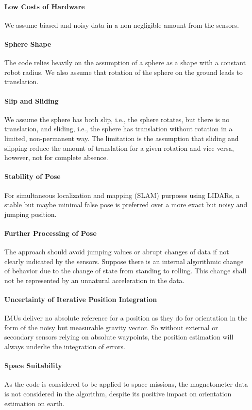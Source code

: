 \documentclass[letterpaper, 10 pt, conference]{ieeeconf}  %
\begin{document}
\paragraph*{Low Costs of Hardware}
We assume biased and noisy data in a non-negligible amount from the sensors.
\paragraph*{Sphere Shape}
The code relies heavily on the assumption of a sphere as a shape with a constant robot radius. We also assume that rotation of the sphere on the ground leads to translation.
\paragraph*{Slip and Sliding}
We assume the sphere has both slip, i.e., the sphere rotates, but there is no translation, and sliding, i.e., the sphere has translation without rotation in a limited, non-permanent way. The limitation is the assumption that sliding and slipping reduce the amount of translation for a given rotation and vice versa, however, not for complete absence.
\paragraph*{Stability of Pose}
For simultaneous localization and mapping (SLAM) purposes using LIDARs, a stable but maybe minimal false pose is preferred over a more exact but noisy and jumping position.
\paragraph*{Further Processing of Pose}
The approach should avoid jumping values or abrupt changes of data if not clearly indicated by the sensors. Suppose there is an internal algorithmic change of behavior due to the change of state from standing to rolling. This change shall not be represented by an unnatural acceleration in the data.
\paragraph*{Uncertainty of Iterative Position Integration}
IMUs deliver no absolute reference for a position as they do for orientation in the form of the noisy but measurable gravity vector. So without external or secondary sensors relying on absolute waypoints, the position estimation will always underlie the integration of errors.
\paragraph*{Space Suitability}
As the code is considered to be applied to space missions, the magnetometer data is not considered in the algorithm, despite its positive impact on orientation estimation on earth.
\end{document}
